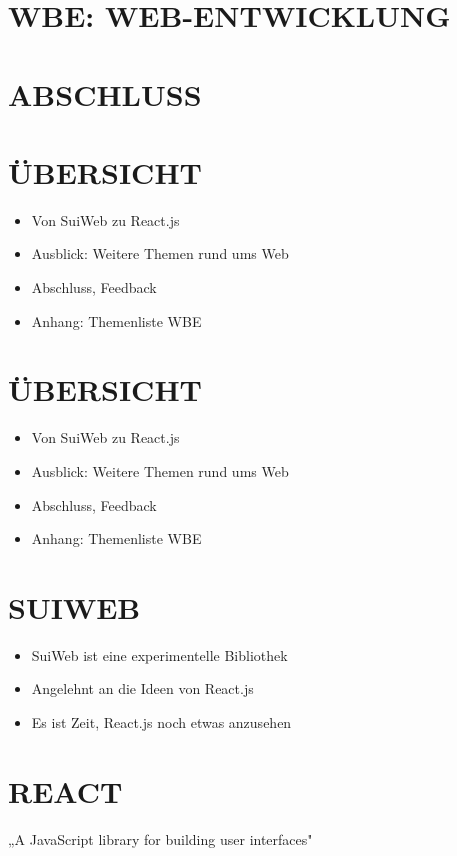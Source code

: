 \documentclass[10pt]{article}
\author{funktional\\
objektorientiert logisch modular}
\date{}
\begin{document}
\maketitle
\section*{WBE: WEB-ENTWICKLUNG}
\section*{ABSCHLUSS}
\section*{ÜBERSICHT}
\begin{itemize}
  \item Von SuiWeb zu React.js
  \item Ausblick: Weitere Themen rund ums Web
  \item Abschluss, Feedback
  \item Anhang: Themenliste WBE
\end{itemize}

\section*{ÜBERSICHT}
\begin{itemize}
  \item Von SuiWeb zu React.js
  \item Ausblick: Weitere Themen rund ums Web
  \item Abschluss, Feedback
  \item Anhang: Themenliste WBE
\end{itemize}

\section*{SUIWEB}
\begin{itemize}
  \item SuiWeb ist eine experimentelle Bibliothek
  \item Angelehnt an die Ideen von React.js
  \item Es ist Zeit, React.js noch etwas anzusehen
\end{itemize}

\section*{REACT}
„A JavaScript library for building user interfaces"
\end{document}
